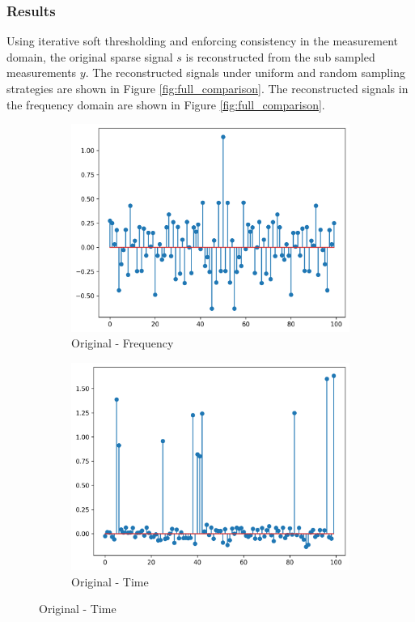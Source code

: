 \documentclass[11pt]{article}
\begin{document}
\subsubsection{Results}
Using iterative soft thresholding and enforcing consistency in the measurement domain, the original sparse signal \( s \) is reconstructed from the sub sampled measurements \( y \). The reconstructed signals under uniform and random sampling strategies are shown in Figure \ref{fig:full_comparison}. The reconstructed signals in the frequency domain are shown in Figure \ref{fig:full_comparison}.

\begin{figure}[H]
    \centering
    \begin{subfigure}{.45\textwidth}
        \centering
        \includegraphics[width=\linewidth]{figs/q2b_original_sparse_signal_fft.png}
        \caption{Original - Frequency}
        \label{fig:original_signal_fft}
    \end{subfigure}%
    \begin{subfigure}{.45\textwidth}
        \centering
        \includegraphics[width=\linewidth]{figs/q2b_original_sparse_signal.png}
        \caption{Original - Time}
        \label{fig:original_signal}
    \end{subfigure}


\end{figure}
\end{document}
